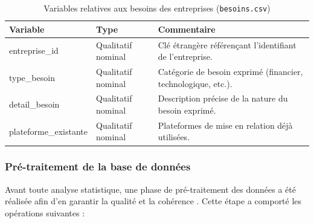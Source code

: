\documentclass[12pt, a4paper, oneside]{report}
\begin{document}
\begin{table}[H]
  \centering
  \caption{Variables relatives aux besoins des entreprises (\texttt{besoins.csv})}
  \label{tab:var_besoins}
  \renewcommand{\arraystretch}{1.5}
  \begin{tabularx}{\textwidth}{
      >{\ttfamily\raggedright\arraybackslash}p{3.8cm}
      >{\raggedright\arraybackslash}p{2.8cm}
      >{\raggedright\arraybackslash}X}

    \toprule
    \rowcolor{primary!15}
    \textbf{Variable} & \textbf{Type} & \textbf{Commentaire} \\
    \midrule

    entreprise\_id & Qualitatif nominal & Clé étrangère référençant l'identifiant de l'entreprise. \\
    \rowcolor{lightgray}
    type\_besoin & Qualitatif nominal & Catégorie de besoin exprimé (financier, technologique, etc.). \\
    detail\_besoin & Qualitatif nominal & Description précise de la nature du besoin exprimé. \\
    \rowcolor{lightgray}
    plateforme\_existante & Qualitatif nominal & Plateformes de mise en relation déjà utilisées. \\

    \bottomrule
  \end{tabularx}
\end{table}

\subsubsection{Pré-traitement de la base de données}

Avant toute analyse statistique, une phase de pré-traitement des données a été réalisée afin d'en garantir la qualité et la cohérence \cite{han2011}. Cette étape a comporté les opérations suivantes :
\end{document}

